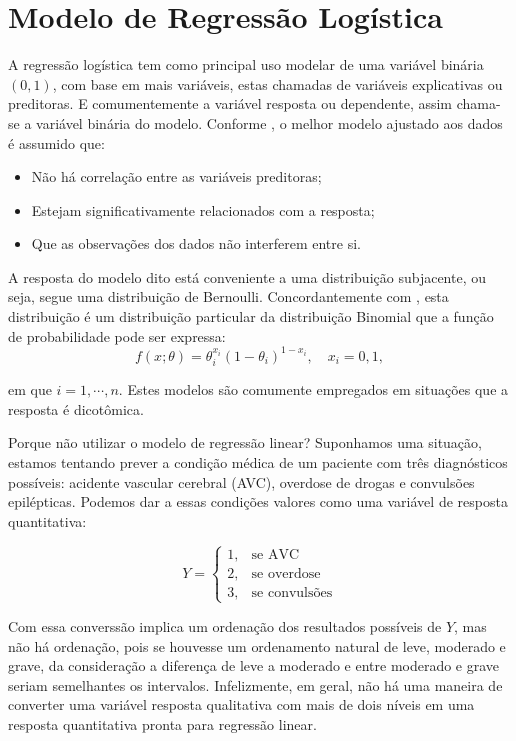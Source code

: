 \documentclass[
	12pt,				%
	openright,			%
	oneside,      %
	a4paper,			%
	english,			%
	french,				%
	spanish,			%
	brazil,				%
	]{abntex2}\usepackage[]{graphicx}\usepackage[]{xcolor}
\begin{document}
  \section{Modelo de Regressão Logística}

  
A regressão logística tem como principal uso modelar de uma variável binária $(0,1)$,
com base em mais variáveis, estas chamadas de variáveis explicativas ou preditoras.
E comumentemente a variável resposta ou dependente, assim chama-se a variável
binária do modelo. Conforme \cite{hilbe2016practical}, o melhor modelo ajustado 
aos dados é assumido que:
\begin{itemize}
  \item Não há correlação entre as variáveis preditoras;
  \item Estejam significativamente relacionados com a resposta;
  \item Que as observações dos dados não interferem entre si.
\end{itemize}
  
A resposta do modelo dito está conveniente a uma distribuição subjacente, ou seja,
segue uma distribuição de Bernoulli. Concordantemente com \cite{bolfarine2001introduccao}, 
esta distribuição é um distribuição particular da distribuição Binomial que 
a função de probabilidade pode ser expressa:
\begin{equation}\label{bernoulli}
  f(x;\theta) = \theta_{i}^{x_i}(1 - \theta_{i})^{1 - x_i}, \quad x_i = 0,1,
\end{equation}

\noindent em que $i = 1,\cdots,n$. Estes modelos são comumente empregados em situações
que a resposta é dicotômica.

Porque não utilizar o modelo de regressão linear? Suponhamos uma situação, estamos 
tentando prever a condição médica de um paciente com três diagnósticos possíveis: 
acidente vascular cerebral (AVC), overdose de drogas e convulsões epilépticas. 
Podemos dar a essas condições valores como uma variável de resposta quantitativa:

$$Y = \left\{
\begin{array}{rcl}
1, & \textrm{se AVC}\\
2, & \textrm{se overdose}\\
3, & \textrm{se convulsões}
\end{array}
\right.$$

Com essa converssão implica um ordenação dos resultados possíveis de $Y$, mas 
não há ordenação, pois se houvesse um ordenamento natural de leve, moderado e 
grave, da consideração a diferença de leve a moderado e entre moderado e grave 
seriam semelhantes os intervalos. Infelizmente, em geral, não há uma maneira de converter
uma variável resposta qualitativa com mais de dois níveis em uma resposta quantitativa 
pronta para regressão linear.
\end{document}
